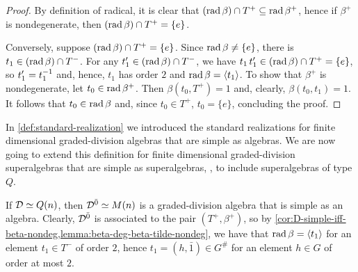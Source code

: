 \begin{proof}
    By definition of radical, it is clear that $(\operatorname{rad} \beta) \cap T^+ \subseteq \operatorname{rad} \beta^+$, hence if $\beta^+$ is nondegenerate, then $(\operatorname{rad} \beta) \cap T^+ = \{e\}$. 
    
    Conversely, suppose $(\operatorname{rad} \beta) \cap T^+ = \{e\}$. 
    Since $\operatorname{rad}\beta \neq \{e\}$, there is $t_1 \in (\operatorname{rad} \beta) \cap T^-$. 
    For any $t_1' \in (\operatorname{rad} \beta) \cap T^-$, we have $t_1 \, t_1' \in (\operatorname{rad}\beta) \cap T^+ = \{e \}$, so $t_1' = t_1^{-1}$ and, hence, $t_1$ has order $2$ and $\operatorname{rad} \beta = \langle t_1 \rangle$. 
    To show that $\beta^+$ is nondegenerate, let $t_0 \in \operatorname{rad} \beta^+$. 
    Then $\beta(t_0, T^+) = 1$ and, clearly, $\beta(t_0, t_1) = 1$. 
    It follows that $t_0 \in \operatorname{rad} \beta$ and, since $t_0 \in T^+$, $t_0 = \{e\}$, concluding the proof. 
\end{proof}


In \cref{def:standard-realization} we introduced the standard realizations for finite dimensional graded-division algebras that are simple as algebras. 
We are now going to extend this definition for finite dimensional graded-division superalgebras that are simple as superalgebras, \ie, to include superalgebras of type $Q$. 

If $\mathcal{D} \simeq Q(n)$, then $\mathcal{D}^{\bar0} \simeq M(n)$ is a graded-division algebra that is simple as an algebra. 
Clearly, $\mathcal{D}^{\bar0}$ is associated to the pair $(T^+, \beta^+)$, so by \cref{cor:D-simple-iff-beta-nondeg,lemma:beta-deg-beta-tilde-nondeg}, we have that $\operatorname{rad} \beta = \langle t_1 \rangle$ for an element $t_1\in T^-$ of order $2$, hence $t_1 = (h, \bar 1) \in G^\#$ for an element $h \in G$ of order at most $2$. 

